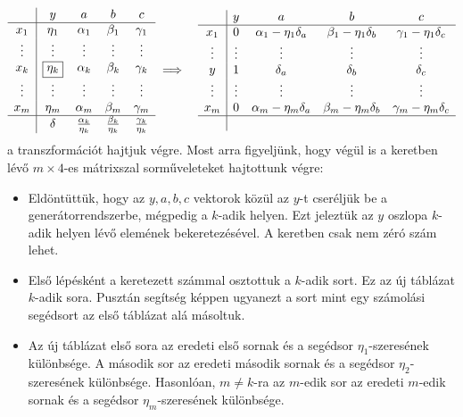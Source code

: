 \documentclass[9pt, showtrims]{memoir}
\theoremstyle{plain}
\theoremstyle{remark}
\theoremstyle{definition}
\begin{document}
\begin{eqnarray*}
    \begin{array}{c|cccc}
                    &y      &a        &b         &c\\
        \hline
        x_1         &\eta_1  &\alpha_1 &\beta_1 &\gamma_1 \\
        \vdots      &\vdots &\vdots    &\vdots  &\vdots\\
        x_k         &\boxed{\eta_k}  &\alpha_k&\beta_k&\gamma_k   \\
        \vdots      &\vdots &\vdots    &\vdots&\vdots\\
        x_m         &\eta_m  &\alpha_m   &\beta_m&\gamma_m\\
        \hline
        &\delta &\frac{\alpha_k}{\eta_k}&\frac{\beta_k}{\eta_k}&\frac{\gamma_k}{\eta_k}\\
    \end{array}
    &\implies&
    \begin{array}{c|cccc}
                    &y      &a         &b        &c\\
        \hline
        x_1         &0  &\alpha_1-\eta_1\delta_a   &\beta_1-\eta_1\delta_b&\gamma_1-\eta_1\delta_c\\
        \vdots      &\vdots &\vdots&\vdots&\vdots    \\
        y           &1  &\delta_a&\delta_b&\delta_c  \\
        \vdots      &\vdots &\vdots &\vdots &\vdots    \\
        x_m         &0  &\alpha_m-\eta_m\delta_a&\beta_m-\eta_m\delta_b&\gamma_m-\eta_m\delta_c   \\
        \hline
       &&
    \end{array}
\end{eqnarray*}
a transzformációt hajtjuk végre.
Most arra figyeljünk, 
hogy végül is a keretben lévő $m\times 4$-es mátrixszal sorműveleteket hajtottunk végre:
\begin{itemize}
    \item 
Eldöntüttük, hogy az $y,a,b,c$ vektorok közül az $y$-t cseréljük be a generátorrendszerbe,
mégpedig a $k$-adik helyen. 
Ezt jeleztük az $y$ oszlopa $k$-adik helyen lévő elemének bekeretezésével. 
A keretben csak nem zéró szám lehet.
    \item 
Első lépésként a keretezett számmal osztottuk a $k$-adik sort. Ez az új táblázat $k$-adik sora.
Pusztán segítség képpen ugyanezt a sort mint egy számolási segédsort az első táblázat alá másoltuk.
    \item 
Az új táblázat első sora az eredeti első sornak és a segédsor $\eta_1$-szeresének különbsége.
A második sor az eredeti második sornak és a segédsor $\eta_2$-szeresének különbsége.
Hasonlóan, $m\neq k$-ra az $m$-edik sor az eredeti $m$-edik sornak és a segédsor $\eta_m$-szeresének különbsége.
\end{itemize}
\end{document}
